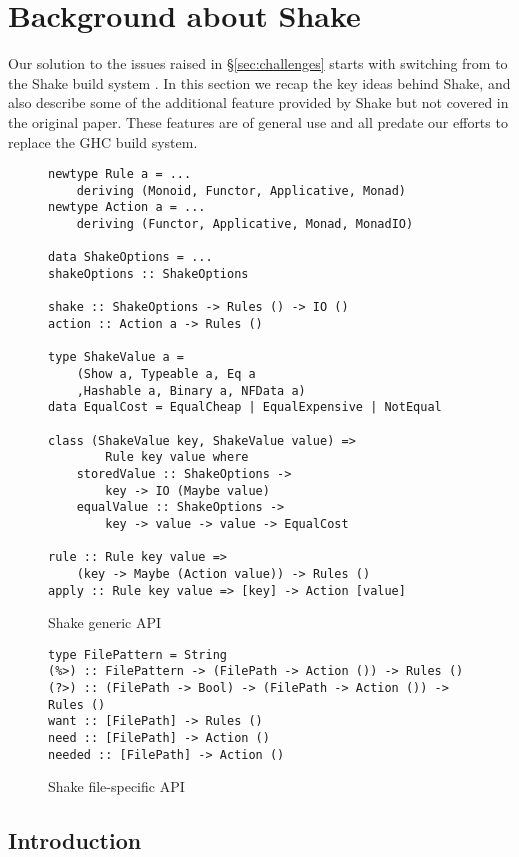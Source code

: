 \section{Background about Shake\label{sec:shake}}

Our solution to the issues raised in \S\ref{sec:challenges} starts with switching from \make{} to the Shake build system \cite{shake}. In this section we recap the key ideas behind Shake, and also describe some of the additional feature provided by Shake but not covered in the original paper. These features are of general use and all predate our efforts to replace the GHC build system.

\begin{figure}
\begin{lstlisting}
newtype Rule a = ...
    deriving (Monoid, Functor, Applicative, Monad)
newtype Action a = ...
    deriving (Functor, Applicative, Monad, MonadIO)

data ShakeOptions = ...
shakeOptions :: ShakeOptions

shake :: ShakeOptions -> Rules () -> IO ()
action :: Action a -> Rules ()

type ShakeValue a =
    (Show a, Typeable a, Eq a
    ,Hashable a, Binary a, NFData a)
data EqualCost = EqualCheap | EqualExpensive | NotEqual

class (ShakeValue key, ShakeValue value) =>
        Rule key value where
    storedValue :: ShakeOptions ->
        key -> IO (Maybe value)
    equalValue :: ShakeOptions ->
        key -> value -> value -> EqualCost

rule :: Rule key value =>
    (key -> Maybe (Action value)) -> Rules ()
apply :: Rule key value => [key] -> Action [value]
\end{lstlisting}
\caption{Shake generic API\label{fig:shake_generic_api}}
\end{figure}

\begin{figure}
\begin{lstlisting}
type FilePattern = String
(%>) :: FilePattern -> (FilePath -> Action ()) -> Rules ()
(?>) :: (FilePath -> Bool) -> (FilePath -> Action ()) -> Rules ()
want :: [FilePath] -> Rules ()
need :: [FilePath] -> Action ()
needed :: [FilePath] -> Action ()
\end{lstlisting}
\caption{Shake file-specific API\label{fig:shake_file_api}}
\end{figure}

\subsection{Introduction}


